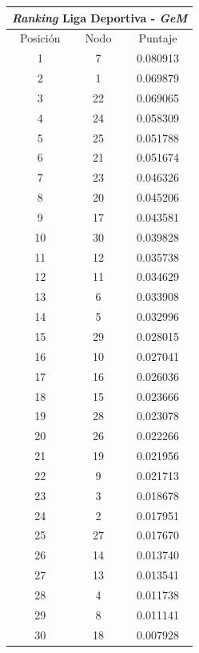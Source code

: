 				\begin{center}
	      			\begin{tabular}{|c|c|c|} 
			      		\hline
			  				\multicolumn{3}{c}{\emph{Ranking} Liga Deportiva - \emph{GeM}} \\
			 			\hline
	        			Posición & Nodo & Puntaje \\ \hline
	         			1 & 7 & 0.080913 \\
	        			2 & 1 & 0.069879 \\
	        			3 & 22 & 0.069065 \\
	        			4 & 24 & 0.058309 \\
	        			5 & 25 & 0.051788 \\
	        			6 & 21 & 0.051674 \\
	        			7 & 23 & 0.046326 \\
	        			8 & 20 & 0.045206 \\
	        			9 & 17 & 0.043581 \\
	        			10 & 30 & 0.039828 \\
	        			11 & 12 & 0.035738 \\
	        			12 & 11 & 0.034629 \\
	        			13 & 6 & 0.033908 \\
	        			14 & 5 & 0.032996 \\
	        			15 & 29 & 0.028015 \\
	        			16 & 10 & 0.027041 \\
	        			17 & 16 & 0.026036 \\
	   					18 & 15 & 0.023666 \\
	   					19 & 28 & 0.023078 \\
	   					20 & 26 & 0.022266 \\
	   					21 & 19 & 0.021956 \\
	   					22 & 9 & 0.021713 \\
	  					23 & 3 & 0.018678 \\
	   					24 & 2 & 0.017951 \\
	   					25 & 27 & 0.017670 \\
	   					26 & 14 & 0.013740 \\
	   					27 & 13 & 0.013541 \\
	   					28 & 4 & 0.011738 \\
	   					29 & 8 & 0.011141 \\
	   					30 & 18 & 0.007928 


\end{tabular}
\end{center}
